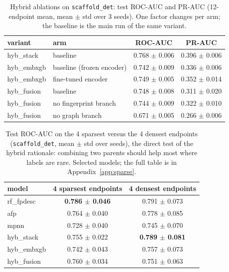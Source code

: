 \documentclass[conference]{IEEEtran}
\newcommand{\code}[1]{\texttt{\small #1}}
\begin{document}
\begin{table}[t]
\centering
\caption{Hybrid ablations on \code{scaffold\_det}: test ROC-AUC and PR-AUC (12-endpoint mean,
mean $\pm$ std over 3 seeds). One factor changes per arm; the baseline is the main run of the
same variant.}
\label{tab:hybrid-ablation}
\small
\begin{tabular}{llcc}
\toprule
variant & arm & ROC-AUC & PR-AUC \\
\midrule
hyb\_stack & baseline & 0.768 $\pm$ 0.006 & 0.396 $\pm$ 0.006 \\
\midrule
hyb\_embxgb & baseline (frozen encoder) & 0.742 $\pm$ 0.009 & 0.336 $\pm$ 0.006 \\
hyb\_embxgb & fine-tuned encoder & 0.749 $\pm$ 0.005 & 0.352 $\pm$ 0.014 \\
\midrule
hyb\_fusion & baseline & 0.748 $\pm$ 0.008 & 0.311 $\pm$ 0.020 \\
hyb\_fusion & no fingerprint branch & 0.744 $\pm$ 0.009 & 0.322 $\pm$ 0.010 \\
hyb\_fusion & no graph branch & 0.671 $\pm$ 0.005 & 0.266 $\pm$ 0.006 \\
\bottomrule
\end{tabular}
\end{table}

\begin{table}[t]
\centering
\caption{Test ROC-AUC on the 4 sparsest versus the 4 densest endpoints (\code{scaffold\_det},
mean $\pm$ std over seeds), the direct test of the hybrid rationale: combining two parents should
help most where labels are rare. Selected models; the full table is in
Appendix~\ref{app:sparse}.}
\label{tab:sparse-short}
\small
\begin{tabular}{lcc}
\toprule
model & 4 sparsest endpoints & 4 densest endpoints \\
\midrule
rf\_fpdesc & \textbf{0.786 $\pm$ 0.046} & 0.791 $\pm$ 0.073 \\
afp & 0.764 $\pm$ 0.040 & 0.778 $\pm$ 0.085 \\
mpnn & 0.728 $\pm$ 0.040 & 0.745 $\pm$ 0.070 \\
hyb\_stack & 0.755 $\pm$ 0.022 & \textbf{0.789 $\pm$ 0.081} \\
hyb\_embxgb & 0.742 $\pm$ 0.043 & 0.757 $\pm$ 0.073 \\
hyb\_fusion & 0.760 $\pm$ 0.034 & 0.751 $\pm$ 0.063 \\
\bottomrule
\end{tabular}
\end{table}
\end{document}

